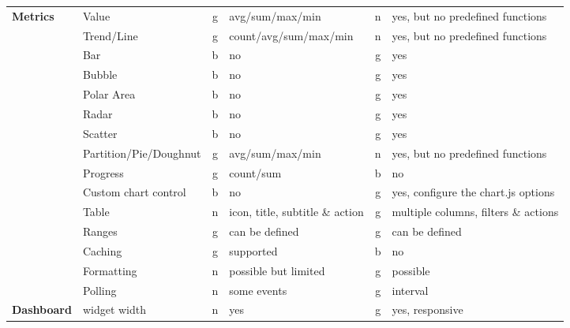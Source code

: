 \begin{table}[!ht]
{\begin{tabular}{llclcl}
            \multirow{15}{*}{\textbf{Metrics}}       & Value                  & g  & avg/sum/max/min                & n  & yes, but no predefined functions        \\
            & Trend/Line             & g  & count/avg/sum/max/min          & n  & yes, but no predefined functions        \\
            & Bar                    & b  & no                             & g  & yes                                     \\
            & Bubble                 & b  & no                             & g  & yes                                     \\
            & Polar Area             & b  & no                             & g  & yes                                     \\
            & Radar                  & b  & no                             & g  & yes                                     \\
            & Scatter                & b  & no                             & g  & yes                                     \\
            & Partition/Pie/Doughnut & g  & avg/sum/max/min                & n  & yes, but no predefined functions        \\
            & Progress               & g  & count/sum                      & b  & no                                      \\
            & Custom chart control   & b  & no                             & g  & yes, configure the chart.js options     \\
            & Table                  & n  & icon, title, subtitle \& action & g  & multiple columns, filters \& actions     \\
            & Ranges                 & g  & can be defined                 & g  & can be defined                          \\
            & Caching                & g  & supported                      & b  & no                                      \\
            & Formatting             & n  & possible but limited           & g  & possible                                \\
            & Polling                & n  & some events                    & g  & interval                                \\
            \hline
            \multirow{3}{*}{\textbf{Dashboard}}      & widget width           & n  & yes                            & g  & yes, responsive                         \\

\end{tabular}}
\end{table}

